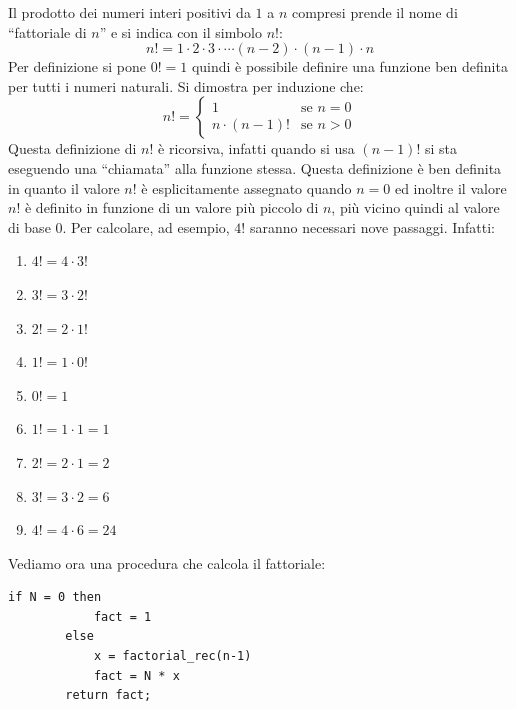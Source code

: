 Il prodotto dei numeri interi positivi da $1$ a $n$ compresi prende il nome di ``fattoriale di $n$'' e si indica con il simbolo $n!$:
\begin{equation}
	n! = 1 \cdot 2 \cdot 3 \cdot \cdots (n-2) \cdot (n-1) \cdot n
\end{equation}
Per definizione si pone $0!=1$ quindi è possibile definire una funzione ben definita per tutti i numeri naturali. Si dimostra per induzione che:
\begin{equation}
	n! = \begin{cases}
		1 & \text{se } n=0\\
		n \cdot(n-1)!& \text{se } n>0
	\end{cases}
\end{equation}
Questa definizione di $n!$ è ricorsiva, infatti quando si usa $(n-1)!$ si sta eseguendo una ``chiamata'' alla funzione stessa. Questa definizione è ben definita in quanto il valore $n!$ è esplicitamente assegnato quando $n=0$ ed inoltre il valore $n!$ è definito in funzione di un valore più piccolo di $n$, più vicino quindi al valore di base $0$. Per calcolare, ad esempio, $4!$ saranno necessari nove passaggi. Infatti:
\begin{enumerate}
	\item $4!=4 \cdot 3!$
	\item \hspace{1cm} $3!=3 \cdot 2!$
	\item \hspace{2cm} $2!=2 \cdot 1!$
	\item \hspace{3cm} $1!=1 \cdot 0!$
	\item \hspace{4.5cm} $0!=1$
	\item \hspace{3cm} $1!=1 \cdot 1 = 1$
	\item \hspace{2cm} $2!=2 \cdot 1 = 2$
	\item \hspace{1cm} $3!=3 \cdot 2 = 6$
	\item $4!=4 \cdot 6 = 24$
\end{enumerate}


Vediamo ora una procedura che calcola il fattoriale:
	\begin{lstlisting}[language=asd,caption={\textsc{factorial\_rec}(N)},label=lst:factR]
		if N = 0 then
			fact = 1
		else
			x = factorial_rec(n-1)
			fact = N * x
		return fact;
	\end{lstlisting}

